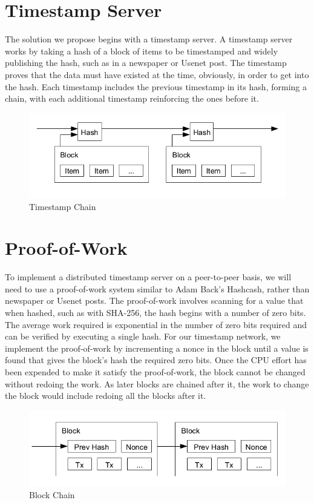 \section{Timestamp Server}

The solution we propose begins with a timestamp server. A timestamp server works by taking a hash of a block of items to be timestamped and widely publishing the hash, such as in a newspaper or Usenet post. The timestamp proves that the data must have existed at the time, obviously, in order to get into the hash. Each timestamp includes the previous timestamp in its hash, forming a chain, with each additional timestamp reinforcing the ones before it.

\begin{figure}[ht!]
\centering
\includegraphics[trim = 0mm 0mm 0mm 0mm, width=120mm]{images/timestamp}
\caption{Timestamp Chain}
\end{figure}

\section{Proof-of-Work}

To implement a distributed timestamp server on a peer-to-peer basis, we will need to use a proof-of-work system similar to Adam Back's Hashcash, rather than newspaper or Usenet posts. The proof-of-work involves scanning for a value that when hashed, such as with SHA-256, the hash begins with a number of zero bits. The average work required is exponential in the number of zero bits required and can be verified by executing a single hash.
For our timestamp network, we implement the proof-of-work by incrementing a nonce in the block until a value is found that gives the block's hash the required zero bits. Once the CPU effort has been expended to make it satisfy the proof-of-work, the block cannot be changed without redoing the work. As later blocks are chained after it, the work to change the block would include redoing all the blocks after it.

\begin{figure}[ht!]
\centering
\includegraphics[trim = 0mm 0mm 0mm 0mm, width=120mm]{images/block_chain}
\caption{Block Chain}
\end{figure}

